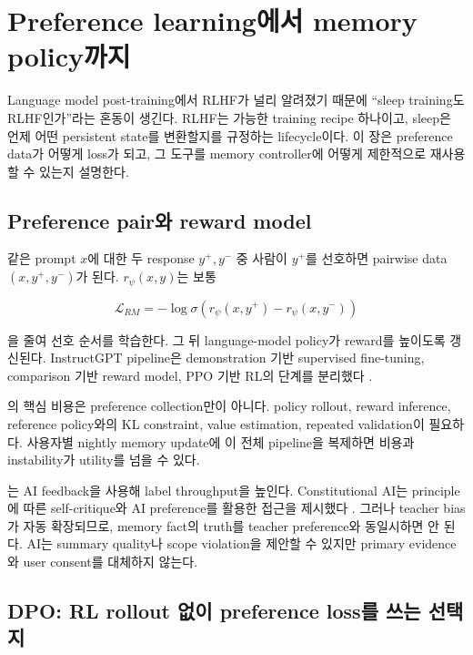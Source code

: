 \chapter{Preference learning에서 memory policy까지}
\label{bg:chapter-rlhf-memory-policy}

Language model post-training에서 RLHF가 널리 알려졌기 때문에 ``sleep training도 RLHF인가''라는
혼동이 생긴다. RLHF는 가능한 training recipe 하나이고, sleep은 언제 어떤 persistent state를
변환할지를 규정하는 lifecycle이다. 이 장은 preference data가 어떻게 loss가 되고, 그 도구를 memory
controller에 어떻게 제한적으로 재사용할 수 있는지 설명한다.

\section{Preference pair와 reward model}

같은 prompt $x$에 대한 두 response $y^+,y^-$ 중 사람이 $y^+$를 선호하면 pairwise data
$(x,y^+,y^-)$가 된다.  $r_\psi(x,y)$는 보통

\begin{equation}
\mathcal{L}_{RM}=-\log\sigma\left(r_\psi(x,y^+)-r_\psi(x,y^-)\right)
\end{equation}

을 줄여 선호 순서를 학습한다. 그 뒤 language-model policy가 reward를 높이도록 갱신된다.
InstructGPT pipeline은 demonstration 기반 supervised fine-tuning, comparison 기반 reward model,
PPO 기반 RL의 단계를 분리했다 \parencite{ouyang2022instructgpt}.

의 핵심 비용은 preference collection만이 아니다. policy rollout, reward inference,
reference policy와의 KL constraint, value estimation, repeated validation이 필요하다. 사용자별 nightly
memory update에 이 전체 pipeline을 복제하면 비용과 instability가 utility를 넘을 수 있다.

는 AI feedback을 사용해 label throughput을 높인다. Constitutional AI는
principle에 따른 self-critique와 AI preference를 활용한 접근을 제시했다 \parencite{bai2022constitutional}.
그러나 teacher bias가 자동 확장되므로, memory fact의 truth를 teacher preference와 동일시하면 안 된다.
AI는 summary quality나 scope violation을 제안할 수 있지만 primary evidence와 user consent를 대체하지 않는다.

\section{DPO: RL rollout 없이 preference loss를 쓰는 선택지}

